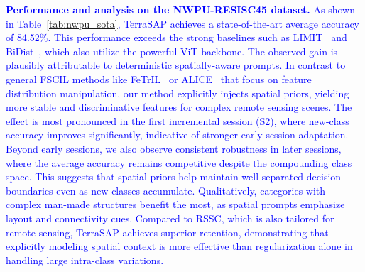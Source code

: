 ﻿\documentclass[letterpaper,journal]{IEEEtran}
\begin{document}
\textcolor{blue}{\textbf{Performance and analysis on the NWPU-RESISC45 dataset.}}
\textcolor{blue}{As shown in Table~\ref{tab:nwpu_sota}, TerraSAP achieves a state-of-the-art average accuracy of 84.52\%. This performance exceeds the strong baselines such as LIMIT~\cite{zhou2023limit} and BiDist~\cite{zhao2023bidist}, which also utilize the powerful ViT backbone. The observed gain is plausibly attributable to deterministic spatially-aware prompts. In contrast to general FSCIL methods like FeTrIL~\cite{petit2023fetril} or ALICE~\cite{peng2022alice} that focus on feature distribution manipulation, our method explicitly injects spatial priors, yielding more stable and discriminative features for complex remote sensing scenes. The effect is most pronounced in the first incremental session (S2), where new-class accuracy improves significantly, indicative of stronger early-session adaptation.}
\textcolor{blue}{Beyond early sessions, we also observe consistent robustness in later sessions, where the average accuracy remains competitive despite the compounding class space. This suggests that spatial priors help maintain well-separated decision boundaries even as new classes accumulate. Qualitatively, categories with complex man-made structures benefit the most, as spatial prompts emphasize layout and connectivity cues. Compared to RSSC, which is also tailored for remote sensing, TerraSAP achieves superior retention, demonstrating that explicitly modeling spatial context is more effective than regularization alone in handling large intra-class variations.}
\end{document}
